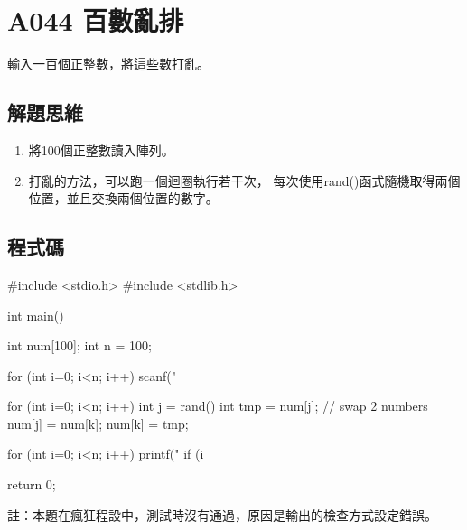 \section{A044 百數亂排}
輸入一百個正整數，將這些數打亂。
\subsection{解題思維}

\begin{enumerate}
	\item 將100個正整數讀入陣列。
	\item 打亂的方法，可以跑一個迴圈執行若干次，
	每次使用rand()函式隨機取得兩個位置，並且交換兩個位置的數字。
\end{enumerate} 
	
\subsection{程式碼}
\begin{cppcode}
	#include <stdio.h>
	#include <stdlib.h>
	
	int main()
	{
		int num[100];
		int n = 100;
		
		for (int i=0; i<n; i++) scanf("%
		
		for (int i=0; i<n; i++) {
			int j = rand() %
			int tmp = num[j]; // swap 2 numbers
			num[j] = num[k];
			num[k] = tmp;
		}
		
		for (int i=0; i<n; i++) {
			printf("%
			if (i%
		}
		
		return 0;
	}
\end{cppcode}
註：本題在瘋狂程設中，測試時沒有通過，原因是輸出的檢查方式設定錯誤。